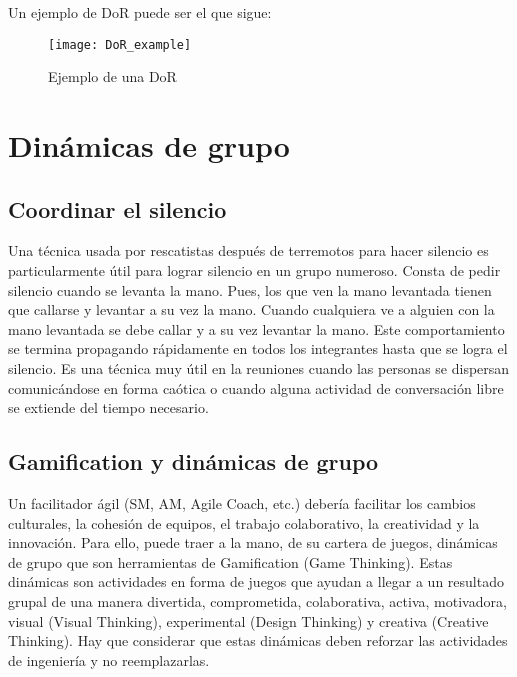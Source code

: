 Un ejemplo de DoR puede ser el que sigue:

\begin{figure}[h]
  \centering
  \texttt{[image: DoR\_example]}
  \caption{Ejemplo de una DoR}
  \centering
  \label{fig:DoR_example} %
\end{figure}
\FloatBarrier %



\newpage
\section{Dinámicas de grupo}
\subsection{Coordinar el silencio}

Una técnica usada por rescatistas después de terremotos para hacer silencio es particularmente útil para lograr silencio en un grupo numeroso. Consta de pedir silencio cuando se levanta la mano. Pues, los que ven la mano levantada tienen que callarse y levantar a su vez la mano. Cuando cualquiera ve a alguien con la mano levantada se debe callar y a su vez levantar la mano. Este comportamiento se termina propagando rápidamente en todos los integrantes hasta que se logra el silencio. Es una técnica muy útil en la reuniones cuando las personas se dispersan comunicándose en forma caótica o cuando alguna actividad de conversación libre se extiende del tiempo necesario.

\subsection{Gamification y dinámicas de grupo}

Un facilitador ágil (SM, AM, Agile Coach, etc.) debería facilitar los cambios culturales, la cohesión de equipos, el trabajo colaborativo, la creatividad y la innovación. Para ello, puede traer a la mano, de su cartera de juegos, dinámicas de grupo que son herramientas de Gamification (Game Thinking). Estas dinámicas son actividades en forma de juegos que ayudan a llegar a un resultado grupal de una manera divertida, comprometida, colaborativa, activa, motivadora, visual (Visual Thinking), experimental (Design Thinking) y creativa (Creative Thinking). Hay que considerar que estas dinámicas deben reforzar las actividades de ingeniería y no reemplazarlas.

